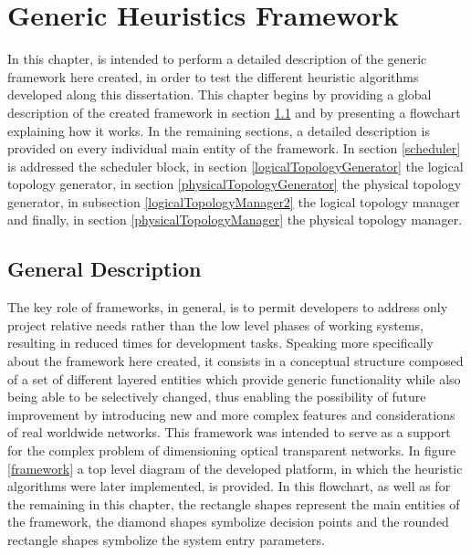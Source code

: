 \chapter{Generic Heuristics Framework}
\label{chapter3}

In this chapter, is intended to perform a detailed description of the generic framework here created, in order to test the different heuristic algorithms developed along this dissertation. This chapter begins by providing a global description of the created framework in section \ref{general_description} and by presenting a flowchart explaining how it works. In the remaining sections, a detailed description is provided on every individual main entity of the framework. In section \ref{scheduler} is addressed the scheduler block, in section \ref{logicalTopologyGenerator} the logical topology generator, in section \ref{physicalTopologyGenerator} the physical topology generator, in subsection \ref{logicalTopologyManager2} the logical topology manager and finally, in section \ref{physicalTopologyManager} the physical topology manager. 

\section{General Description}
\label{general_description}
The key role of frameworks, in general, is to permit developers to address only project relative needs rather than the low level phases of working systems, resulting in reduced times for development tasks. Speaking more specifically about the framework here created, it consists in a conceptual structure composed of a set of different layered entities which provide generic functionality while also being able to be selectively changed, thus enabling the possibility of future improvement by introducing new and more complex features and considerations of real worldwide networks. This framework was intended to serve as a support for the complex  problem of dimensioning optical transparent networks. In figure \ref{framework} a top level diagram of the developed platform, in which the heuristic algorithms were later implemented, is provided. In this flowchart, as well as for the remaining in this chapter, the rectangle shapes represent the main entities of the framework, the diamond shapes symbolize decision points and the rounded rectangle shapes symbolize the system entry parameters.
\clearpage


